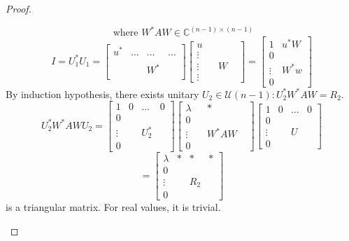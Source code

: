 \documentclass[a4paper]{article}
\numberwithin{lecref}{section}
\begin{document}
\begin{proof}
\begin{description}
      \[ \text{ where } W^* AW \in \mathbb C^{(n - 1) \times (n-1)} \]
      \[ I = U_1^* U_1 = \begin{bmatrix} u^* & \dots & \dots & \dots \\ & & & \\ & & W^* & \\ & & & \end{bmatrix} \begin{bmatrix} u & & & \\ \vdots & & & \\ \vdots & & W & \\ \vdots & & & \end{bmatrix} = \begin{bmatrix} 1 & u^* W \\ 0 & \\ \vdots & W^* w \\ 0 & \end{bmatrix} \]
      By induction hypothesis, there exists unitary $U_2 \in \mathcal U(n-1): U_2^* W^* AW = R_2$.
      \[
        U_2^* W^* AW U_2 = 
        \begin{bmatrix}
          1 & 0 & \dots & 0 \\
          0 &    &      & \\
          \vdots & & U_2^* & \\
          0 &    &      &
        \end{bmatrix}
        \begin{bmatrix}
          \lambda & & * & \\
          0 &       &   & \\
          \vdots &  & W^* AW & \\
          0 &       &   &
        \end{bmatrix}
        \begin{bmatrix}
          1 & 0 & \dots & 0 \\
          0 &       &   & \\
          \vdots &  & U & \\
          0 &       &   &
        \end{bmatrix}
      \] \[
        = \begin{bmatrix}
          \lambda & * & *   & * \\
          0 &         &     & \\
          \vdots  &   & R_2 & \\
          0 &         &     &
        \end{bmatrix}
      \]
      is a triangular matrix. For real values, it is trivial.
  \end{description}
\end{proof}
\end{document}
